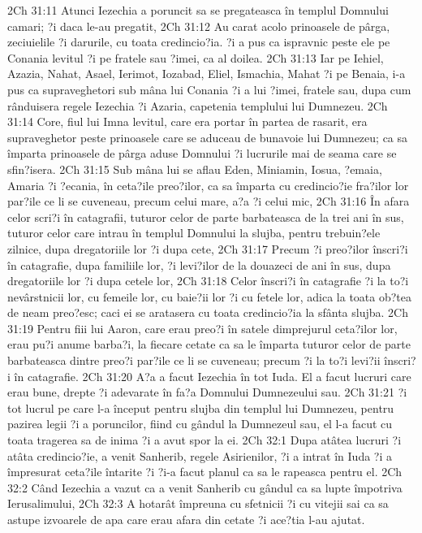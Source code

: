 2Ch 31:11  Atunci Iezechia a poruncit sa se pregateasca în templul Domnului camari; ?i daca le-au pregatit,
2Ch 31:12  Au carat acolo prinoasele de pârga, zeciuielile ?i darurile, cu toata credincio?ia. ?i a pus ca ispravnic peste ele pe Conania levitul ?i pe fratele sau ?imei, ca al doilea.
2Ch 31:13  Iar pe Iehiel, Azazia, Nahat, Asael, Ierimot, Iozabad, Eliel, Ismachia, Mahat ?i pe Benaia, i-a pus ca supraveghetori sub mâna lui Conania ?i a lui ?imei, fratele sau, dupa cum rânduisera regele Iezechia ?i Azaria, capetenia templului lui Dumnezeu.
2Ch 31:14  Core, fiul lui Imna levitul, care era portar în partea de rasarit, era supraveghetor peste prinoasele care se aduceau de bunavoie lui Dumnezeu; ca sa împarta prinoasele de pârga aduse Domnului ?i lucrurile mai de seama care se sfin?isera.
2Ch 31:15  Sub mâna lui se aflau Eden, Miniamin, Iosua, ?emaia, Amaria ?i ?ecania, în ceta?ile preo?ilor, ca sa împarta cu credincio?ie fra?ilor lor par?ile ce li se cuveneau, precum celui mare, a?a ?i celui mic,
2Ch 31:16  În afara celor scri?i în catagrafii, tuturor celor de parte barbateasca de la trei ani în sus, tuturor celor care intrau în templul Domnului la slujba, pentru trebuin?ele zilnice, dupa dregatoriile lor ?i dupa cete,
2Ch 31:17  Precum ?i preo?ilor înscri?i în catagrafie, dupa familiile lor, ?i levi?ilor de la douazeci de ani în sus, dupa dregatoriile lor ?i dupa cetele lor,
2Ch 31:18  Celor înscri?i în catagrafie ?i la to?i nevârstnicii lor, cu femeile lor, cu baie?ii lor ?i cu fetele lor, adica la toata ob?tea de neam preo?esc; caci ei se aratasera cu toata credincio?ia la sfânta slujba.
2Ch 31:19  Pentru fiii lui Aaron, care erau preo?i în satele dimprejurul ceta?ilor lor, erau pu?i anume barba?i, la fiecare cetate ca sa le împarta tuturor celor de parte barbateasca dintre preo?i par?ile ce li se cuveneau; precum ?i la to?i levi?ii înscri?i în catagrafie.
2Ch 31:20  A?a a facut Iezechia în tot Iuda. El a facut lucruri care erau bune, drepte ?i adevarate în fa?a Domnului Dumnezeului sau.
2Ch 31:21  ?i tot lucrul pe care l-a început pentru slujba din templul lui Dumnezeu, pentru pazirea legii ?i a poruncilor, fiind cu gândul la Dumnezeul sau, el l-a facut cu toata tragerea sa de inima ?i a avut spor la ei.
2Ch 32:1  Dupa atâtea lucruri ?i atâta credincio?ie, a venit Sanherib, regele Asirienilor, ?i a intrat în Iuda ?i a împresurat ceta?ile întarite ?i ?i-a facut planul ca sa le rapeasca pentru el.
2Ch 32:2  Când Iezechia a vazut ca a venit Sanherib cu gândul ca sa lupte împotriva Ierusalimului,
2Ch 32:3  A hotarât împreuna cu sfetnicii ?i cu vitejii sai ca sa astupe izvoarele de apa care erau afara din cetate ?i ace?tia l-au ajutat.
